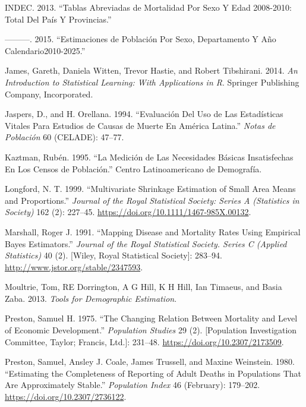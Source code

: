 \documentclass[12pt,]{article}
\begin{document}
\leavevmode\hypertarget{ref-INDEC2013}{}%
INDEC. 2013. ``Tablas Abreviadas de Mortalidad Por Sexo Y Edad
2008-2010: Total Del País Y Provincias.''

\leavevmode\hypertarget{ref-INDEC2015}{}%
---------. 2015. ``Estimaciones de Población Por Sexo, Departamento Y
Año Calendario2010-2025.''

\leavevmode\hypertarget{ref-James2014}{}%
James, Gareth, Daniela Witten, Trevor Hastie, and Robert Tibshirani.
2014. \emph{An Introduction to Statistical Learning: With Applications
in R}. Springer Publishing Company, Incorporated.

\leavevmode\hypertarget{ref-JaspersOrellana1994}{}%
Jaspers, D., and H. Orellana. 1994. ``Evaluación Del Uso de Las
Estadísticas Vitales Para Estudios de Causas de Muerte En América
Latina.'' \emph{Notas de Población} 60 (CELADE): 47--77.

\leavevmode\hypertarget{ref-Kaztman1995}{}%
Kaztman, Rubén. 1995. ``La Medición de Las Necesidades Básicas
Insatisfechas En Los Censos de Población.'' Centro Latinoamericano de
Demografía.

\leavevmode\hypertarget{ref-Longford1999}{}%
Longford, N. T. 1999. ``Multivariate Shrinkage Estimation of Small Area
Means and Proportions.'' \emph{Journal of the Royal Statistical Society:
Series A (Statistics in Society)} 162 (2): 227--45.
\url{https://doi.org/10.1111/1467-985X.00132}.

\leavevmode\hypertarget{ref-Marshall1991}{}%
Marshall, Roger J. 1991. ``Mapping Disease and Mortality Rates Using
Empirical Bayes Estimators.'' \emph{Journal of the Royal Statistical
Society. Series C (Applied Statistics)} 40 (2). {[}Wiley, Royal
Statistical Society{]}: 283--94.
\url{http://www.jstor.org/stable/2347593}.

\leavevmode\hypertarget{ref-Moultrie}{}%
Moultrie, Tom, RE Dorrington, A G Hill, K H Hill, Ian Timaeus, and Basia
Zaba. 2013. \emph{Tools for Demographic Estimation}.

\leavevmode\hypertarget{ref-Preston_1975}{}%
Preston, Samuel H. 1975. ``The Changing Relation Between Mortality and
Level of Economic Development.'' \emph{Population Studies} 29 (2).
{[}Population Investigation Committee, Taylor; Francis, Ltd.{]}:
231--48. \url{https://doi.org/10.2307/2173509}.

\leavevmode\hypertarget{ref-Preston1980}{}%
Preston, Samuel, Ansley J. Coale, James Trussell, and Maxine Weinstein.
1980. ``Estimating the Completeness of Reporting of Adult Deaths in
Populations That Are Approximately Stable.'' \emph{Population Index} 46
(February): 179--202. \url{https://doi.org/10.2307/2736122}.
\end{document}

